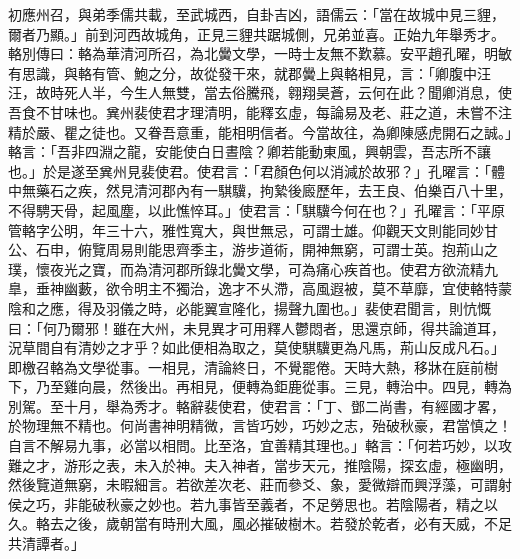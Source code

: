 \begin{pinyinscope}
初應州召，與弟季儒共載，至武城西，自卦吉凶，語儒云：「當在故城中見三貍，爾者乃顯。」前到河西故城角，正見三貍共踞城側，兄弟並喜。正始九年舉秀才。輅別傳曰：輅為華清河所召，為北黌文學，一時士友無不歎慕。安平趙孔曜，明敏有思識，與輅有管、鮑之分，故從發干來，就郡黌上與輅相見，言：「卿腹中汪汪，故時死人半，今生人無雙，當去俗騰飛，翱翔昊蒼，云何在此？聞卿消息，使吾食不甘味也。兾州裴使君才理清明，能釋玄虛，每論易及老、莊之道，未嘗不注精於嚴、瞿之徒也。又眷吾意重，能相明信者。今當故往，為卿陳感虎開石之誠。」輅言：「吾非四淵之龍，安能使白日晝陰？卿若能動東風，興朝雲，吾志所不讓也。」於是遂至兾州見裴使君。使君言：「君顏色何以消減於故邪？」孔曜言：「體中無藥石之疾，然見清河郡內有一騏驥，拘縶後廄歷年，去王良、伯樂百八十里，不得騁天骨，起風塵，以此憔悴耳。」使君言：「騏驥今何在也？」孔曜言：「平原管輅字公明，年三十六，雅性寬大，與世無忌，可謂士雄。仰觀天文則能同妙甘公、石申，俯覽周易則能思齊季主，游步道術，開神無窮，可謂士英。抱荊山之璞，懷夜光之寶，而為清河郡所錄北黌文學，可為痛心疾首也。使君方欲流精九臯，垂神幽藪，欲令明主不獨治，逸才不乆滯，高風遐被，莫不草靡，宜使輅特蒙陰和之應，得及羽儀之時，必能翼宣隆化，揚聲九圍也。」裴使君聞言，則忼慨曰：「何乃爾邪！雖在大州，未見異才可用釋人鬱悶者，思還京師，得共論道耳，況草間自有清妙之才乎？如此便相為取之，莫使騏驥更為凡馬，荊山反成凡石。」即檄召輅為文學從事。一相見，清論終日，不覺罷倦。天時大熱，移牀在庭前樹下，乃至雞向晨，然後出。再相見，便轉為鉅鹿從事。三見，轉治中。四見，轉為別駕。至十月，舉為秀才。輅辭裴使君，使君言：「丁、鄧二尚書，有經國才畧，於物理無不精也。何尚書神明精微，言皆巧妙，巧妙之志，殆破秋豪，君當慎之！自言不解易九事，必當以相問。比至洛，宜善精其理也。」輅言：「何若巧妙，以攻難之才，游形之表，未入於神。夫入神者，當步天元，推陰陽，探玄虛，極幽明，然後覽道無窮，未暇細言。若欲差次老、莊而參爻、象，愛微辯而興浮藻，可謂射侯之巧，非能破秋豪之妙也。若九事皆至義者，不足勞思也。若陰陽者，精之以久。輅去之後，歲朝當有時刑大風，風必摧破樹木。若發於乾者，必有天威，不足共清譚者。」


\end{pinyinscope}
